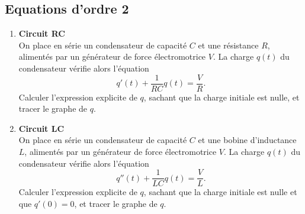 \documentclass[a4paper, 11pt,reqno]{article}
\begin{document}
\subsection{Equations d'ordre 2}
\vspace{0.2cm}




\begin{exercice}  \;
\begin{enumerate}
\item \textbf{Circuit RC}\\
On place en s\'erie un condensateur de capacit\'e $C$ et une r\'esistance $R$, aliment\'es par un g\'en\'erateur de force \'electromotrice $V$. La charge $q(t)$ du condensateur v\'erifie alors l'\'equation
$$q'(t) + \frac{1}{RC} q(t) = \frac{V}{R}.$$
Calculer l'expression explicite de $q$, sachant que la charge initiale est nulle, et tracer le graphe de $q$.
\item \textbf{Circuit LC}\\
On place en s\'erie un condensateur de capacit\'e $C$ et une bobine d'inductance $L$, aliment\'es par un g\'en\'erateur de force \'electromotrice $V$. La charge $q(t)$ du condensateur v\'erifie alors l'\'equation
$$q''(t) + \frac{1}{LC} q(t) = \frac{V}{L}.$$
Calculer l'expression explicite de $q$, sachant que la charge initiale est nulle et que $q'(0)=0$, et tracer le graphe de $q$.
\end{enumerate}
\end{exercice}
\end{document}
